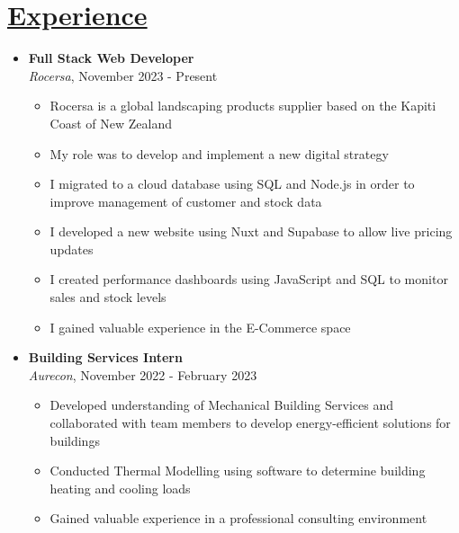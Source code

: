 \documentclass[a4paper,10pt]{article}
\begin{document}
\section*{\uline{Experience}}
\begin{itemize}
    \item \textbf{Full Stack Web Developer} \\
    \textit{Rocersa}, November 2023 - Present \\
    \vspace{-0.5cm}
    \begin{itemize}
        \item Rocersa is a global landscaping products supplier based on the Kapiti Coast of New Zealand
        \item My role was to develop and implement a new digital strategy
        \item I migrated to a cloud database using SQL and Node.js in order to improve management of customer and stock data
        \item I developed a new website using Nuxt and Supabase to allow live pricing updates
        \item I created performance dashboards using JavaScript and SQL to monitor sales and stock levels
        \item I gained valuable experience in the E-Commerce space
    \end{itemize}
    \item \textbf{Building Services Intern} \\
    \textit{Aurecon}, November 2022 - February 2023 \\
    \vspace{-0.5cm}
    \begin{itemize}
        \item Developed understanding of Mechanical Building Services and collaborated with team members to develop energy-efficient solutions for buildings
        \item Conducted Thermal Modelling using software to determine building heating and cooling loads
        \item Gained valuable experience in a professional consulting environment
    \end{itemize}
\end{itemize}
\end{document}
